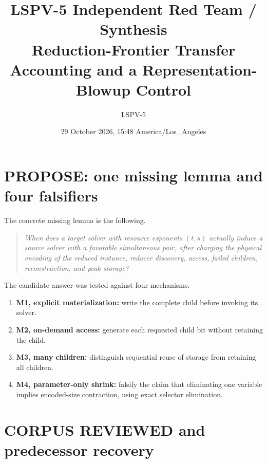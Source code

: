 \documentclass[11pt]{article}
\title{LSPV-5 Independent Red Team / Synthesis\\
Reduction-Frontier Transfer Accounting and a Representation-Blowup Control}
\author{LSPV-5}
\date{29 October 2026, 15:48 America/Los\_Angeles}
\begin{document}
\sloppy
\maketitle

\begin{center}
\end{center}

\section{PROPOSE: one missing lemma and four falsifiers}

The concrete missing lemma is the following.

\begin{quote}
\emph{When does a target solver with resource exponents $(t,s)$ actually induce a source solver
with a favorable simultaneous pair, after charging the physical encoding of the reduced instance,
reducer discovery, access, failed children, reconstruction, and peak storage?}
\end{quote}

The candidate answer was tested against four mechanisms.
\begin{enumerate}
\item \textbf{M1, explicit materialization:} write the complete child before invoking its solver.
\item \textbf{M2, on-demand access:} generate each requested child bit without retaining the child.
\item \textbf{M3, many children:} distinguish sequential reuse of storage from retaining all children.
\item \textbf{M4, parameter-only shrink:} falsify the claim that eliminating one variable implies
encoded-size contraction, using exact selector elimination.
\end{enumerate}

\section{CORPUS REVIEWED and predecessor recovery}
\end{document}
